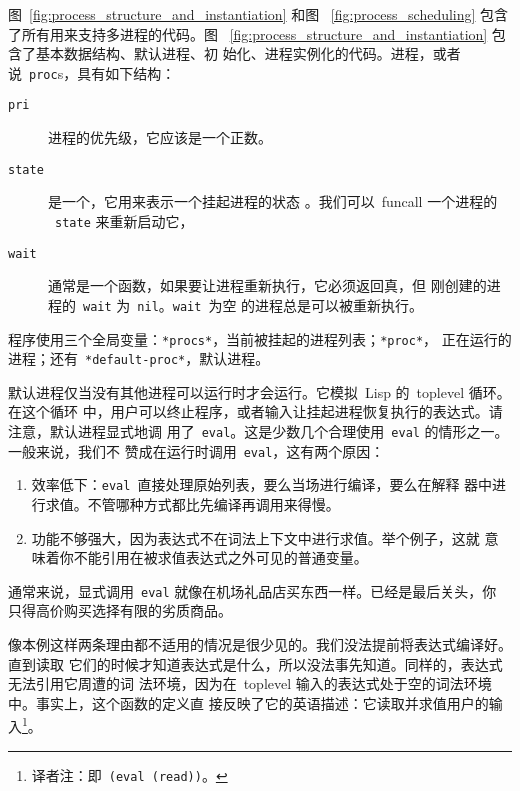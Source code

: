 图~\ref{fig:process_structure_and_instantiation} 和图
~\ref{fig:process_scheduling} 包含了所有用来支持多进程的代码。图
~\ref{fig:process_structure_and_instantiation} 包含了基本数据结构、默认进程、初
始化、进程实例化的代码。进程，或者说~\texttt{proc}s，具有如下结构：

\begin{description}
  \item[\texttt{pri}] 进程的优先级，它应该是一个正数。

  \item[\texttt{state}] 是一个\continuation{}，它用来表示一个挂起进程的状态
      。我们可以~funcall 一个进程的
      ~\texttt{state} 来重新启动它，

  \item[\texttt{wait}] 通常是一个函数，如果要让进程重新执行，它必须返回真，但
    刚创建的进程的~\texttt{wait} 为~\texttt{nil}。\texttt{wait}~为空
    的进程总是可以被重新执行。
\end{description}

程序使用三个全局变量：\texttt{*procs*}，当前被挂起的进程列表；\texttt{*proc*}，
正在运行的进程；还有~\texttt{*default-proc*}，默认进程。

默认进程仅当没有其他进程可以运行时才会运行。它模拟~Lisp 的~toplevel 循环。在这个循环
中，用户可以终止程序，或者输入让挂起进程恢复执行的表达式。请注意，默认进程显式地调
用了~\texttt{eval}。这是少数几个合理使用~\texttt{eval} 的情形之一。一般来说，我们不
赞成在运行时调用~\texttt{eval}\label{why-eval-is-bad}，这有两个原因：\label{expl:eval}
\begin{enumerate}
    \item 效率低下：\texttt{eval}~直接处理原始列表，要么当场进行编译，要么在解释
        器中进行求值。不管哪种方式都比先编译再调用来得慢。
    \item 功能不够强大，因为表达式不在词法上下文中进行求值。举个例子，这就
        意味着你不能引用在被求值表达式之外可见的普通变量。
\end{enumerate}
\label{bad-eval}
通常来说，显式调用~\texttt{eval} 就像在机场礼品店买东西一样。已经是最后关头，你
只得高价购买选择有限的劣质商品。

像本例这样两条理由都不适用的情况是很少见的。我们没法提前将表达式编译好。直到读取
它们的时候才知道表达式是什么，所以没法事先知道。同样的，表达式无法引用它周遭的词
法环境，因为在~toplevel 输入的表达式处于空的词法环境中。事实上，这个函数的定义直
接反映了它的英语描述：它读取并求值用户的输入\footnote{译者注：即~\texttt{(eval
(read))}。}。

